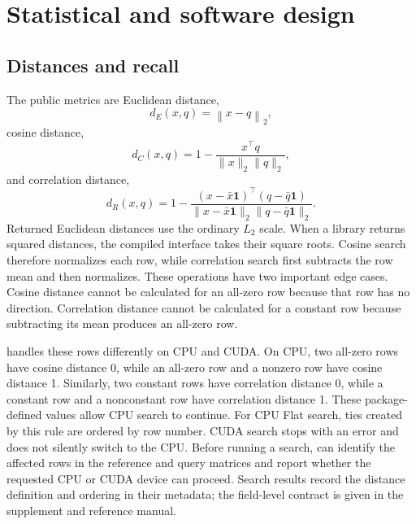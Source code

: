 \documentclass[article]{jss}
\newcommand{\fct}[1]{\code{#1()}}
\begin{document}
\FloatBarrier
\section{Statistical and software design} \label{sec:design}

\subsection{Distances and recall}

The public metrics are Euclidean distance,
\begin{equation}
d_E(x,q)=\left\|x-q\right\|_2,
\end{equation}
cosine distance,
\begin{equation}
d_C(x,q)=1-\frac{x^\top q}{\|x\|_2\|q\|_2},
\end{equation}
and correlation distance,
\begin{equation}
d_R(x,q)=1-\frac{(x-\bar{x}\mathbf{1})^\top
(q-\bar{q}\mathbf{1})}{\|x-\bar{x}\mathbf{1}\|_2
\|q-\bar{q}\mathbf{1}\|_2}.
\end{equation}
Returned Euclidean distances use the ordinary $L_2$ scale. When a library
returns squared distances, the compiled interface takes their square roots.
Cosine search therefore normalizes each row, while correlation search first
subtracts the row mean and then normalizes. These operations have two important
edge cases. Cosine distance cannot be calculated for an all-zero row because
that row has no direction. Correlation distance cannot be calculated for a
constant row because subtracting its mean produces an all-zero row.

 handles these rows differently on CPU and CUDA. On CPU, two
all-zero rows have cosine distance 0, while an all-zero row and a nonzero row
have cosine distance 1. Similarly, two constant rows have correlation distance
0, while a constant row and a nonconstant row have correlation distance 1.
These package-defined values allow CPU search to continue. For CPU Flat search,
ties created by this rule are ordered by row number. CUDA search stops with an
error and does not silently switch to the CPU. Before running a search,
\fct{nn\_metric\_preflight} can identify the affected rows in the reference and
query matrices and report whether the requested CPU or CUDA device can proceed.
Search results record the distance definition and ordering in their metadata;
the field-level contract is given in the supplement and reference manual.
\end{document}
